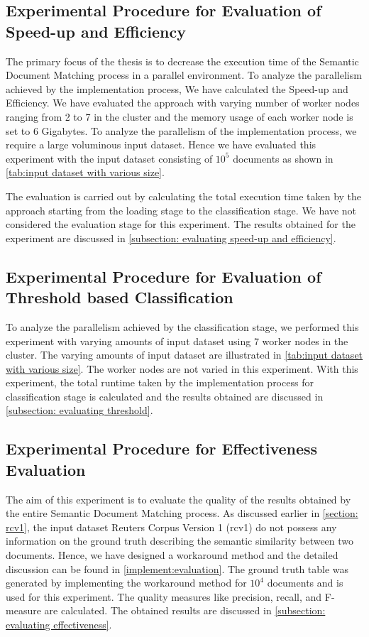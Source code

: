 \subsection{Experimental Procedure for Evaluation of Speed-up and Efficiency }
The primary focus of the thesis is to decrease the execution time of the Semantic Document Matching process in a parallel environment. To analyze the parallelism achieved by the implementation process, We have calculated the Speed-up and Efficiency. We have evaluated the approach with varying number of worker nodes ranging from 2 to 7 in the cluster and the memory usage of each worker node is set to 6 Gigabytes. To analyze the parallelism of the implementation process, we require a large voluminous input dataset. Hence we have evaluated this experiment with the input dataset consisting of \(10^5\) documents as shown in \ref{tab:input dataset with various size}.  

\par The evaluation is carried out by calculating the total execution time taken by the approach starting from the loading stage to the classification stage. We have not considered the evaluation stage for this experiment. The results obtained for the experiment are discussed in \ref{subsection: evaluating speed-up and efficiency}.

\subsection{Experimental Procedure for Evaluation of Threshold based Classification }

To analyze the parallelism achieved by the classification stage, we performed this experiment with varying amounts of input dataset using 7 worker nodes in the cluster. The varying amounts of input dataset are illustrated in \ref{tab:input dataset with various size}. The worker nodes are not varied in this experiment. With this experiment, the total runtime taken by the implementation process for classification stage is calculated and the results obtained are discussed in \ref{subsection: evaluating threshold}.


\subsection{Experimental Procedure for Effectiveness Evaluation}

The aim of this experiment is to evaluate the quality of the results obtained by the entire Semantic Document Matching process. As discussed earlier in \ref{section: rcv1}, the input dataset Reuters Corpus Version 1 (rcv1) do not possess any information on the ground truth describing the semantic similarity between two documents. Hence, we have designed a workaround method and the detailed discussion can be found in \ref{implement:evaluation}. The ground truth table was generated by implementing the workaround method for \(10^4\) documents and is used for this experiment. The quality measures like precision, recall, and F-measure are calculated. The obtained results are discussed in \ref{subsection: evaluating effectiveness}.


